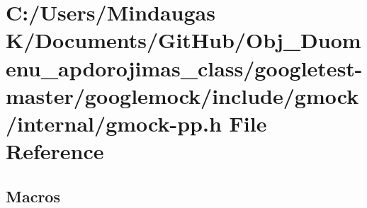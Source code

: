 \hypertarget{googletest-master_2googlemock_2include_2gmock_2internal_2gmock-pp_8h}{}\section{C\+:/\+Users/\+Mindaugas K/\+Documents/\+Git\+Hub/\+Obj\+\_\+\+Duomenu\+\_\+apdorojimas\+\_\+class/googletest-\/master/googlemock/include/gmock/internal/gmock-\/pp.h File Reference}
\label{googletest-master_2googlemock_2include_2gmock_2internal_2gmock-pp_8h}
\subsection*{Macros}
